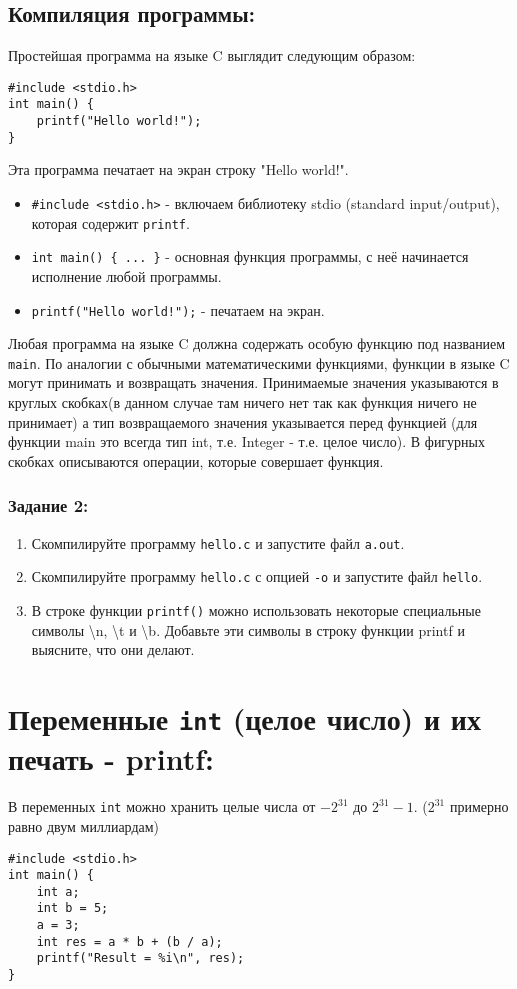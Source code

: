 \documentclass{article}
\begin{document}
\subsection*{Компиляция программы:}
Простейшая программа на языке C выглядит следующим образом:
\begin{lstlisting}
#include <stdio.h>
int main() {
    printf("Hello world!");
}
\end{lstlisting}

Эта программа печатает на экран строку "Hello world!".
\begin{itemize}
\item \texttt{\#include <stdio.h>}  - включаем библиотеку stdio (standard input/output), которая содержит \texttt{printf}.
\item \texttt{int main() \{ ... \}} - основная функция программы, с неё начинается исполнение любой программы.
\item \texttt{printf("Hello world!");} - печатаем на экран.
\end{itemize}

Любая программа на языке C должна содержать особую функцию под названием \texttt{main}. По аналогии с обычными математическими функциями, функции в языке C могут принимать и возвращать значения. Принимаемые значения указываются в круглых скобках(в данном случае там ничего нет так как функция ничего не принимает) а тип возвращаемого значения указывается перед функцией (для функции main это всегда тип int, т.е. Integer - т.е. целое число). В фигурных скобках описываются операции, которые совершает функция. 

\subsubsection*{Задание 2:}
\begin{enumerate}
\item Скомпилируйте программу \texttt{hello.c} и запустите файл \texttt{a.out}.
\item Скомпилируйте программу \texttt{hello.c} с опцией \texttt{-o} и запустите файл \texttt{hello}.
\item В строке функции \texttt{printf()} можно использовать некоторые специальные символы \textbackslash n, \textbackslash t и \textbackslash b. Добавьте эти символы в строку функции printf и выясните, что они делают.
\end{enumerate}

\section*{Переменные \texttt{int} (целое число) и их печать - printf:}
В переменных \texttt{int} можно хранить целые числа от $-2^{31}$ до $2^{31} - 1$. ($2^{31}$ примерно равно двум миллиардам)
\begin{lstlisting}
#include <stdio.h>
int main() {
    int a;
    int b = 5;
    a = 3;
    int res = a * b + (b / a);
    printf("Result = %i\n", res);
}
\end{lstlisting}
\end{document}
